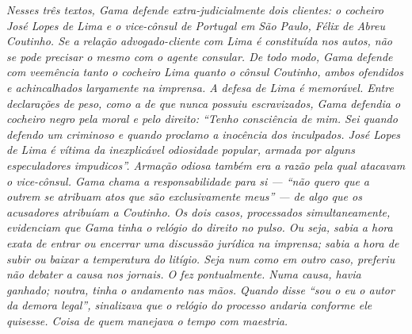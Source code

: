 \begin{didas}
\emph{Nesses três textos, Gama defende extra-judicialmente dois
clientes: o cocheiro José Lopes de Lima e o vice-cônsul de Portugal em
São Paulo, Félix de Abreu Coutinho. Se a relação advogado-cliente com
Lima é constituída nos autos, não se pode precisar o mesmo com o agente
consular. De todo modo, Gama defende com veemência tanto o cocheiro Lima
quanto o cônsul Coutinho, ambos ofendidos e achincalhados largamente na
imprensa. A defesa de Lima é memorável. Entre declarações de peso, como
a de que nunca possuiu escravizados, Gama defendia o cocheiro negro pela
moral e pelo direito: ``Tenho consciência de mim. Sei quando defendo um
criminoso e quando proclamo a inocência dos inculpados. José Lopes de
Lima é vítima da inexplicável odiosidade popular, armada por alguns
especuladores impudicos''. Armação odiosa também era a razão pela qual
atacavam o vice-cônsul. Gama chama a responsabilidade para si --- ``não
quero que a outrem se atribuam atos que são exclusivamente meus'' --- de
algo que os acusadores atribuíam a Coutinho. Os dois casos, processados
simultaneamente, evidenciam que Gama tinha o relógio do direito no
pulso. Ou seja, sabia a hora exata de entrar ou encerrar uma discussão
jurídica na imprensa; sabia a hora de subir ou baixar a temperatura do
litígio. Seja num como em outro caso, preferiu não debater a causa nos
jornais. O fez pontualmente. Numa causa, havia ganhado; noutra, tinha o
andamento nas mãos. Quando disse ``sou o eu o autor da demora legal'',
sinalizava que o relógio do processo andaria conforme ele quisesse.
Coisa de quem manejava o tempo com maestria. }
\end{didas}


